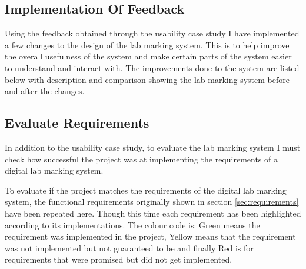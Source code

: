 \documentclass[12pt]{article}  %
\begin{document}
\subsection{Implementation Of Feedback}

Using the feedback obtained through the usability case study I  have implemented a few changes to the design of the lab marking system. This is to help improve the overall usefulness of the system and make certain parts of the system easier to understand and interact with. The improvements done to the system are listed below with description and comparison showing the lab marking system before and after the changes.  


\subsection{Evaluate Requirements}

In addition to the usability case study, to evaluate the lab marking system I must check how successful the project was at implementing the requirements of a digital lab marking system. 

To evaluate if the project matches the requirements of the digital lab marking system, the functional requirements originally shown in section \ref{sec:requirements} have been repeated here. Though this time each requirement has been highlighted according to its implementations. The colour code is: Green means the requirement was implemented in the project, Yellow means that the requirement was not implemented but not guaranteed to be and finally Red is for requirements that were promised but did not get implemented.   
\end{document}
